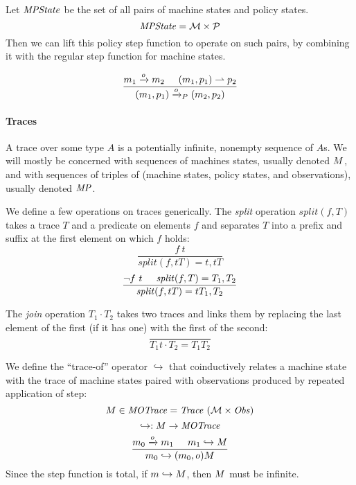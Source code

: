\documentclass[acmsmall,review,anonymous]{acmart}\settopmatter{printfolios=true,printccs=false,printacmref=false}
\begin{document}
Let $\mathit{MPState}$ be the set of all pairs of machine states and policy states.
%
\[\mathit{MPState} = {\mathcal M} \times \mathcal{P}\]
%
Then we can lift this policy step function to operate on such pairs,
by combining it with the regular step function for machine states.


    \[\frac{m_1 \xrightarrow{o} m_2 \hspace{.5cm} (m_1, p_1) \rightharpoonup p_2}
           {(m_1,p_1) \xrightarrow{o}_P (m_2,p_2)}\]

\paragraph{Traces}

A trace over some type $A$ is a potentially infinite, nonempty
sequence of $A$s. We will mostly be concerned with sequences of
machines states, usually denoted $M$, and with sequences of
triples of (machine states, policy states, and observations), usually
denoted $\mathit{MP}$.

We define a few operations on traces generically.
The {\it split} operation \(\mathit{split}(f,T)\) takes a trace \(T\) and a predicate on elements \(f\) and
separates \(T\) into a prefix and suffix at the first element on which \(f\) holds:
  \[\frac{f\ t}
         {\mathit{split}(f,tT) = t, tT}\]
  \[\frac{\neg f\ t \hspace{.5cm} \mathit{split}(f,T) = T_1,T_2}
         {\mathit{split}(f,tT) = tT_1,T_2}\]

The {\it join} operation \(T_1 \cdot T_2\) takes two traces and links them by replacing the last element
of the first (if it has one) with the first of the second:
  \[\frac{}
         {T_1t \cdot T_2 = T_1 T_2}\]

We define the ``trace-of'' operator \(\hookrightarrow\) that coinductively
relates a machine state with the trace of machine states paired with
observations produced by repeated application of step:
\[M \in \mathit{MOTrace} = \mathit{Trace}\ ({\mathcal M} \times \mathit{Obs})\]
\[\hookrightarrow : M \rightarrow \mathit{MOTrace}\]
%
\[\frac{m_0 \xrightarrow{o} m_1 \hspace{.5cm} m_1 \hookrightarrow M}
       {m_0 \hookrightarrow (m_0,o) M}\]
%
Since the step function is total, if \(m \hookrightarrow M\),
then \(M\) must be infinite.
\end{document}
